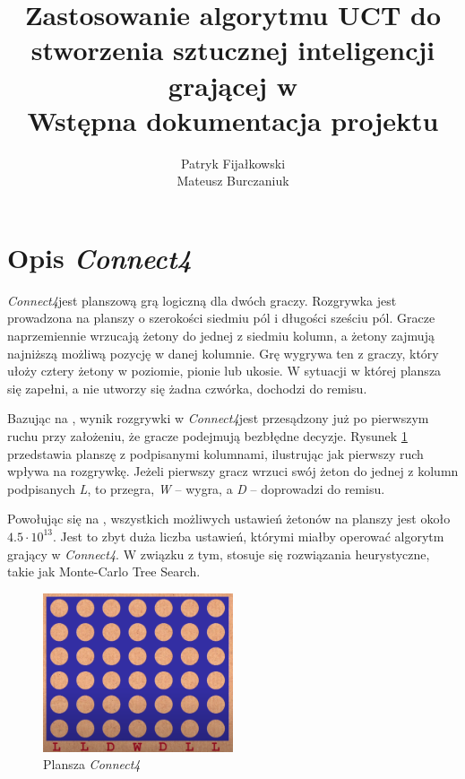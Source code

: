 \documentclass[a4paper,12pt]{article}
\title{
	Zastosowanie algorytmu UCT do stworzenia sztucznej inteligencji grającej w \nazwagry\\
	\large Wstępna dokumentacja projektu}
\author{Patryk Fijałkowski \\ Mateusz Burczaniuk}
\let\oldsection\section
\renewcommand\section{\clearpage\oldsection}
\newcommand{\nazwagry}{\textit{Connect4}}
\begin{document}
\begin{titlingpage}
	\maketitle
	\vspace{3cm}
\end{titlingpage}


\section{Opis \nazwagry}
\nazwagry jest planszową grą logiczną dla dwóch graczy. Rozgrywka jest prowadzona na planszy o szerokości siedmiu pól i długości sześciu pól. Gracze naprzemiennie wrzucają żetony do jednej z siedmiu kolumn, a żetony zajmują najniższą możliwą pozycję w danej kolumnie. Grę wygrywa ten z graczy, który ułoży cztery żetony w poziomie, pionie lub ukosie. W sytuacji w której plansza się zapełni, a nie utworzy się żadna czwórka, dochodzi do remisu.

Bazując na \cite{connect4knowledge}, wynik rozgrywki w \nazwagry jest przesądzony już po pierwszym ruchu przy założeniu, że gracze podejmują bezbłędne decyzje. Rysunek \ref{rys:board} przedstawia planszę z podpisanymi kolumnami, ilustrując jak pierwszy ruch wpływa na rozgrywkę. Jeżeli pierwszy gracz wrzuci swój żeton do jednej z kolumn podpisanych \textit{L}, to przegra, \textit{W} -- wygra, a \textit{D} -- doprowadzi do remisu.

Powołując się na \cite{connect4knowledge}, wszystkich możliwych ustawień żetonów na planszy jest około $4.5 \cdot 10^{13}$. Jest to zbyt duża liczba ustawień, którymi miałby operować algorytm grający w \nazwagry. W związku z tym, stosuje się rozwiązania heurystyczne, takie jak Monte-Carlo Tree Search.

\begin{figure}[h]
	\centering
	\includegraphics[width=0.5\textwidth]{board_winlose.png}
	\caption{Plansza \nazwagry}
	\label{rys:board}
\end{figure}
\end{document}
